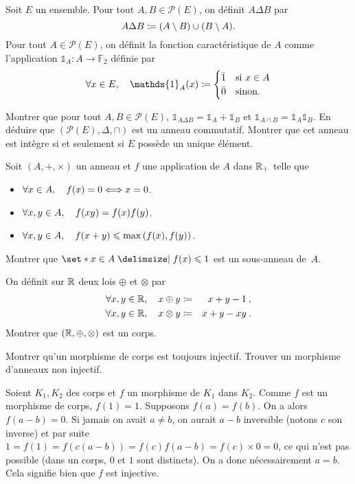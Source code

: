 \documentclass{magnolia}
\begin{document}



Soit $E$ un ensemble. Pour tout $A,B\in\mathcal{P}(E)$, on définit $A\Delta B$ par
\[A\Delta B\coloneqq(A\setminus B)\cup(B\setminus A).\]
Pour tout $A\in\mathcal{P}(E)$, on définit la fonction caractéristique de $A$ comme
l'application $\mathds{1}_A:A\to\mathbb{F}_2$ définie par
\[\forall x\in E \qsep \mathds{1}_A(x)\defeq
\begin{cases}
\bar{1} & \text{si $x\in A$}\\
\bar{0} & \text{sinon.}
\end{cases}\]
\begin{questions}
\question Montrer que pour tout $A,B\in\mathcal{P}(E)$,
  $\mathds{1}_{A\Delta B}=\mathds{1}_A + \mathds{1}_B$ et
  $\mathds{1}_{A\cap B}=\mathds{1}_A \mathds{1}_B$.
\question En déduire que $(\mathcal{P}(E),\Delta,\cap)$ est un anneau commutatif.
\question Montrer que cet anneau est intègre si et seulement si $E$ possède un unique
  élément.
\end{questions}

Soit $(A,+,\times)$ un anneau et $f$ une application de $A$ dans $\mathbb{R}_+$ telle
que
\begin{itemize}
\item $\forall x\in A ,\quad f(x)=0 \Longleftrightarrow x=0$.
\item $\forall x,y\in A ,\quad f(xy)=f(x)f(y)$.
\item $\forall x,y\in A ,\quad f(x+y)\leqslant \max\left(f(x),f(y)\right)$.
\end{itemize}
Montrer que $\enstq{x\in A}{f(x)\leq 1}$ est un sous-anneau de~$A$.


On définit sur $\mathbb{R}$ deux lois $\oplus$ et $\otimes$ par
\begin{eqnarray*}
\forall x,y\in\mathbb{R},\quad x\oplus y&\coloneqq&x+y-1\>,\\
\forall x,y\in\mathbb{R},\quad x\otimes y&\coloneqq&x+y-xy\>.
\end{eqnarray*}
Montrer que $(\mathbb{R},\oplus,\otimes)$ est un corps.

Montrer qu'un morphisme de corps est toujours injectif. Trouver un morphisme
d'anneaux non injectif.

\begin{sol}
Soient $K_1, K_2$ des corps et $f$ un morphisme de $K_1$ dans $K_2$. Comme $f$ est un morphisme de corps, $f(1)=1$. Supposons $f(a)=f(b)$. On a alors $f(a-b)=0$. Si jamais on avait $a \neq b$, on aurait $a-b$ inversible (notons $c$ son inverse) et par suite $1=f(1)=f(c(a-b))=f(c)f(a-b)=f(c)\times 0=0$, ce qui n'est pas possible (dans un corps, $0$ et $1$ sont distincts). On a donc nécessairement $a=b$. Cela signifie bien que $f$ est injective.
\end{sol}
\end{document}
